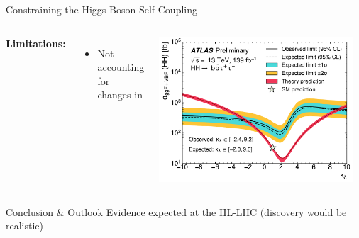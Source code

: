 \documentclass[11pt, xcolor={dvipsnames}, aspectratio=169]{beamer}
\begin{document}

\begin{frame}{Constraining the Higgs Boson Self-Coupling}

  \begin{columns}[onlytextwidth]

    \textbf{Limitations:}
    \begin{itemize}
    \item Not accounting for changes in
    \end{itemize}

     \centering

    \includegraphics[width=0.95\textwidth]{self_coupling/klam_scan_result}
  \end{columns}

\end{frame}


\begin{frame}{Conclusion \& Outlook}
  Evidence expected at the HL-LHC (discovery would be realistic)
\end{frame}

\end{document}
